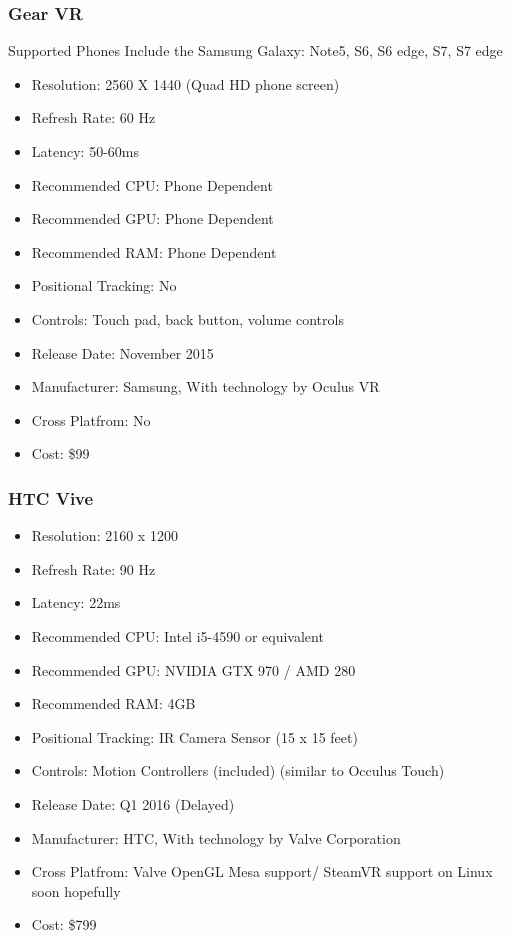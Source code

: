 \documentclass[a4paper,10pt]{article}
\begin{document}
\subsubsection{Gear VR}
	Supported Phones Include the Samsung Galaxy: Note5, S6, S6 edge, S7, S7 edge  
	\begin{itemize}
	  \item Resolution: 2560 X 1440 (Quad HD phone screen)
	  \item Refresh Rate: 60 Hz
	  \item Latency: 50-60ms
	  \item Recommended CPU: Phone Dependent
	  \item Recommended GPU: Phone Dependent
	  \item Recommended RAM: Phone Dependent
	  \item Positional Tracking: No
	  \item Controls: Touch pad, back button, volume controls
	  \item Release Date: November 2015
	  \item Manufacturer: Samsung, With technology by Oculus VR
	  \item Cross Platfrom: No
	  \item Cost: \$99
	\end{itemize}
\subsubsection{HTC Vive}
	\begin{itemize}
	  \item Resolution: 2160 x 1200
	  \item Refresh Rate: 90 Hz
	  \item Latency: 22ms
	  \item Recommended CPU: Intel i5-4590 or equivalent
	  \item Recommended GPU: NVIDIA GTX 970 / AMD 280 
	  \item Recommended RAM: 4GB
	  \item Positional Tracking: IR Camera Sensor (15 x 15 feet)
	  \item Controls: Motion Controllers (included) (similar to Occulus Touch)  
	  \item Release Date: Q1 2016 (Delayed)
	  \item Manufacturer: HTC, With technology by Valve Corporation
	  \item Cross Platfrom: Valve OpenGL Mesa support/ SteamVR support on Linux soon hopefully
	  \item Cost: \$799
	\end{itemize}
\end{document}
